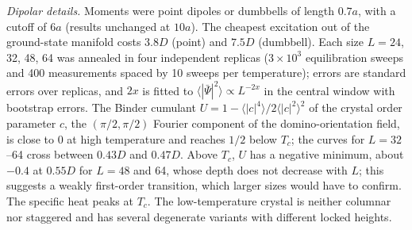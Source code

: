 \documentclass[aps,prb,twocolumn,floatfix,longbibliography]{revtex4-2}
\begin{document}
\emph{Dipolar details.} Moments were point dipoles or dumbbells of length $0.7a$, with a cutoff of $6a$ (results unchanged at $10a$). The cheapest excitation out of the ground-state manifold costs $3.8D$ (point) and $7.5D$ (dumbbell). Each size $L=24$, 32, 48, 64 was annealed in four independent replicas ($3\times10^3$ equilibration sweeps and 400 measurements spaced by 10 sweeps per temperature); errors are standard errors over replicas, and $2x$ is fitted to $\langle|\bar\Psi|^2\rangle\propto L^{-2x}$ in the central window with bootstrap errors. The Binder cumulant $U=1-\langle|c|^4\rangle/2\langle|c|^2\rangle^2$ of the crystal order parameter $c$, the $(\pi/2,\pi/2)$ Fourier component of the domino-orientation field, is close to 0 at high temperature and reaches $1/2$ below $T_c$; the curves for $L=32$--64 cross between $0.43D$ and $0.47D$. Above $T_c$, $U$ has a negative minimum, about $-0.4$ at $0.55D$ for $L=48$ and 64, whose depth does not decrease with $L$; this suggests a weakly first-order transition, which larger sizes would have to confirm. The specific heat peaks at $T_c$. The low-temperature crystal is neither columnar nor staggered and has several degenerate variants with different locked heights.

\clearpage

\end{document}
